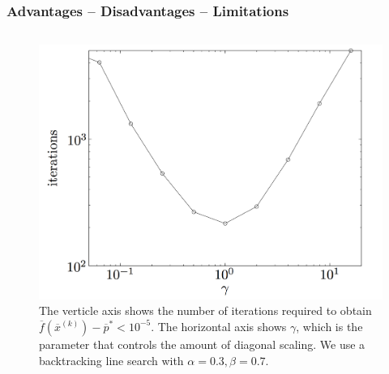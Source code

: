 \begin{frame}
  \frametitle{Advantages -- Disadvantages -- Limitations}




\begin{columns}
  \begin{column}{0.5\textwidth}
    \begin{figure}[ht!]
      \centering
\includegraphics[scale=0.15]{pics/ga1.png}
\caption{\tiny The
  verticle axis shows the number of iterations required to obtain
  $\overline{f}(\overline{x}^{(k)}) - \overline{p}^* < 10^{-5}$. The
  horizontal axis shows $\gamma$, which is the  parameter that controls the amount of diagonal scaling. We use a
backtracking line search with $\alpha = 0.3, \beta = 0.7$.}
    \end{figure}
  \end{column}


\end{columns}
\end{frame}
